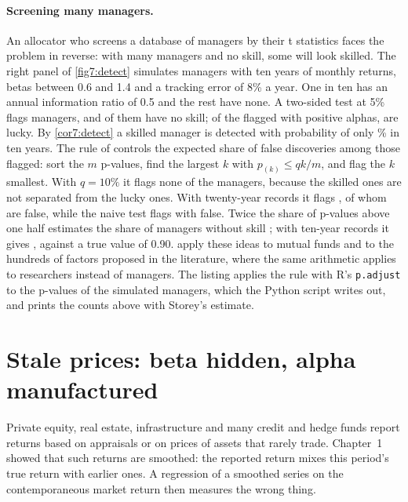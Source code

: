 \begin{chapterrefs}
\paragraph{Screening many managers.}
An allocator who screens a database of managers by their t statistics faces the problem in reverse:
with many managers and no skill, some will look skilled. The right panel of \cref{fig7:detect}
simulates \mgN{} managers with ten years of monthly returns, betas between 0.6 and 1.4 and a tracking
error of 8\% a year. One in ten has an annual information ratio of 0.5 and the rest have none. A
two-sided test at 5\% flags \mgNaive{} managers, and \mgNaiveFalse{} of them have no skill; of the
\mgNaivePos{} flagged with positive alphas, \mgNaivePosFalse{} are lucky. By \cref{cor7:detect} a
skilled manager is detected with probability of only \mgPowerTheory\% in ten years. The rule of
\textcite{benjamini1995} controls the expected share of false discoveries among those flagged: sort
the $m$ p-values, find the largest $k$ with $p_{(k)}\le qk/m$, and flag the $k$ smallest. With
$q=10\%$ it flags none of the \mgN{} managers, because the skilled ones are not separated from the
lucky ones. With twenty-year records it flags \mgLongBh, of whom \mgLongBhFalse{} are false, while the
naive test flags \mgLongNaive{} with \mgLongNaiveFalse{} false. Twice the share of p-values above one half
estimates the share of managers without skill \parencite{storey2002}; with ten-year records it gives \mgPiZero, against
a true value of 0.90. \textcite{barras2010} apply these ideas to mutual funds and
\textcite{harvey2016} to the hundreds of factors proposed in the literature, where the same
arithmetic applies to researchers instead of managers.
The listing applies the rule with R's \texttt{p.adjust} to the p-values of the simulated managers,
which the Python script writes out, and prints the counts above with Storey's estimate.


\FloatBarrier
\section{Stale prices: beta hidden, alpha manufactured}
\label{sec7:smoothing}

Private equity, real estate, infrastructure and many credit and hedge funds report returns based on
appraisals or on prices of assets that rarely trade. Chapter~1 showed that such returns are smoothed:
the reported return mixes this period's true return with earlier ones. A regression of a smoothed
series on the contemporaneous market return then measures the wrong thing.


\end{chapterrefs}
